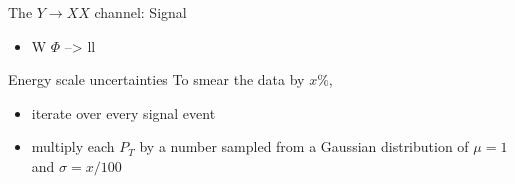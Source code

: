 \documentclass[bigger]{beamer}
\begin{document}
\begin{frame}[label={sec:org8ad639b}]{The \(Y \rightarrow XX\) channel: Signal}
\begin{itemize}
\item W \(\Phi\) --> ll
\end{itemize}
\end{frame}

\begin{frame}[label={sec:orgbec14de}]{Energy scale uncertainties}
To smear the data by \(x\%\),
\begin{itemize}
\item iterate over every signal event
\item multiply each \(P_{T}\) by a number sampled from a Gaussian distribution of \(\mu = 1\) and \(\sigma = x/100\)
\end{itemize}
\end{frame}
\end{document}
